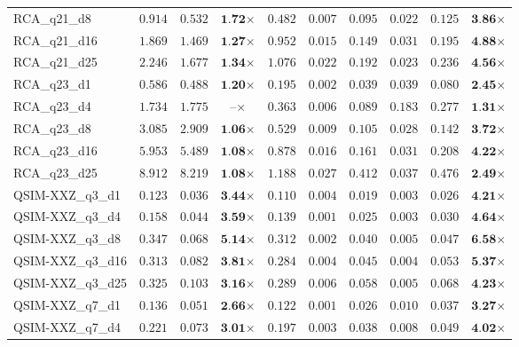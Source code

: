 \begin{table*}[t]
{\begin{tabular}{| l || r r c || r r r r r c |}
RCA\_q21\_d8 & $0.914$ & $0.532$ & $\textbf{1.72}$$\times$ & $0.482$ & $0.007$ & $0.095$ & $0.022$ & $0.125$ & $\textbf{3.86}$$\times$ \\
RCA\_q21\_d16 & $1.869$ & $1.469$ & $\textbf{1.27}$$\times$ & $0.952$ & $0.015$ & $0.149$ & $0.031$ & $0.195$ & $\textbf{4.88}$$\times$ \\
RCA\_q21\_d25 & $2.246$ & $1.677$ & $\textbf{1.34}$$\times$ & $1.076$ & $0.022$ & $0.192$ & $0.023$ & $0.236$ & $\textbf{4.56}$$\times$ \\
RCA\_q23\_d1 & $0.586$ & $0.488$ & $\textbf{1.20}$$\times$ & $0.195$ & $0.002$ & $0.039$ & $0.039$ & $0.080$ & $\textbf{2.45}$$\times$ \\
RCA\_q23\_d4 & $1.734$ & $1.775$ & $\textbf{--}$$\times$ & $0.363$ & $0.006$ & $0.089$ & $0.183$ & $0.277$ & $\textbf{1.31}$$\times$ \\
RCA\_q23\_d8 & $3.085$ & $2.909$ & $\textbf{1.06}$$\times$ & $0.529$ & $0.009$ & $0.105$ & $0.028$ & $0.142$ & $\textbf{3.72}$$\times$ \\
RCA\_q23\_d16 & $5.953$ & $5.489$ & $\textbf{1.08}$$\times$ & $0.878$ & $0.016$ & $0.161$ & $0.031$ & $0.208$ & $\textbf{4.22}$$\times$ \\
RCA\_q23\_d25 & $8.912$ & $8.219$ & $\textbf{1.08}$$\times$ & $1.188$ & $0.027$ & $0.412$ & $0.037$ & $0.476$ & $\textbf{2.49}$$\times$ \\
QSIM-XXZ\_q3\_d1 & $0.123$ & $0.036$ & $\textbf{3.44}$$\times$ & $0.110$ & $0.004$ & $0.019$ & $0.003$ & $0.026$ & $\textbf{4.21}$$\times$ \\
QSIM-XXZ\_q3\_d4 & $0.158$ & $0.044$ & $\textbf{3.59}$$\times$ & $0.139$ & $0.001$ & $0.025$ & $0.003$ & $0.030$ & $\textbf{4.64}$$\times$ \\
QSIM-XXZ\_q3\_d8 & $0.347$ & $0.068$ & $\textbf{5.14}$$\times$ & $0.312$ & $0.002$ & $0.040$ & $0.005$ & $0.047$ & $\textbf{6.58}$$\times$ \\
QSIM-XXZ\_q3\_d16 & $0.313$ & $0.082$ & $\textbf{3.81}$$\times$ & $0.284$ & $0.004$ & $0.045$ & $0.004$ & $0.053$ & $\textbf{5.37}$$\times$ \\
QSIM-XXZ\_q3\_d25 & $0.325$ & $0.103$ & $\textbf{3.16}$$\times$ & $0.289$ & $0.006$ & $0.058$ & $0.005$ & $0.068$ & $\textbf{4.23}$$\times$ \\
QSIM-XXZ\_q7\_d1 & $0.136$ & $0.051$ & $\textbf{2.66}$$\times$ & $0.122$ & $0.001$ & $0.026$ & $0.010$ & $0.037$ & $\textbf{3.27}$$\times$ \\
QSIM-XXZ\_q7\_d4 & $0.221$ & $0.073$ & $\textbf{3.01}$$\times$ & $0.197$ & $0.003$ & $0.038$ & $0.008$ & $0.049$ & $\textbf{4.02}$$\times$ \\

\end{tabular}}
\end{table*}
